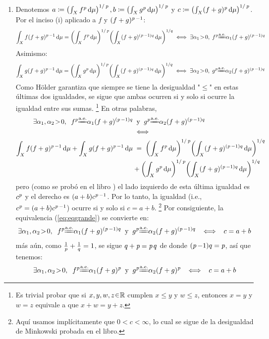 \begin{sol}
\begin{enumerate}[label = (\roman*), leftmargin=1.5em]
\item 
Denotemos $a \coloneq \left(\int_Xf^{\operatorname{\textit{p}}}\dd{\mu}\right)^{1/\operatorname{\textit{p}}}, b \coloneq \left(\int_Xg^{\operatorname{\textit{p}}}\dd{\mu}\right)^{1/\operatorname{\textit{p}}}$ y $c\coloneq \left(\int_X(f+g)^{\operatorname{\textit{p}}}\dd{\mu}\right)^{1/\operatorname{\textit{p}}}$. Por el inciso (i) aplicado a $f$ y $(f+g)^{\operatorname{\textit{p}}-1}$:
\begin{align*}
\int_Xf(f+g)^{\p-1}\dd{\mu} 
=
\left( \int_X f^{\p} \dd{\mu} \right)^{1/\p}\!\left( \int_X (f+g)^{(\p-1)q} \dd{\mu} \right)^{1/q} 
\iff
\exists \alpha_1\!>\!0,\;f^{\p} \!\!\ctpeq\!\! \alpha_1(f+g)^{(\p-1)q}
\end{align*}
Asimismo:
\begin{align*}
\int_Xg(f+g)^{\p-1}\dd{\mu} 
=
\left( \int_X g^{\p} \dd{\mu} \right)^{1/\p}\!\left( \int_X (f+g)^{(\p-1)q} \dd{\mu} \right)^{1/q} 
\iff
\exists \alpha_2\!>\!0,\;g^{\p} \!\!\ctpeq\!\! \alpha_2(f+g)^{(\p-1)q}
\end{align*}
Como Hölder garantiza que siempre se tiene la desigualdad "$\leq$" en estas últimas dos igualdades, se sigue que ambas ocurren si y solo si ocurre la igualdad entre sus sumas.%
\footnote{
    Es trivial probar que si $x,y,w,z\en\mathbb{R}$ cumplen $x \le y$ y $w \le z$, entonces $x=y$ y $w = z$ equivale a que $x+w = y+z$.
}
En otras palabras,
\begin{equation}\label{eq:eqgrande}
\begin{split}
\exists \alpha_1,\alpha_2\!>\!0,\;\; f^{\p} \!\!\ctpeq\!\! \alpha_1(f+g)^{(\p-1)q} &\;\;\text{y}\;\; g^{\p} \!\!\ctpeq\!\! \alpha_2(f+g)^{(\p-1)q}\\
&\iff\\
\int_Xf(f+g)^{\p-1}\dd{\mu} + \int_Xg(f+g)^{\p-1}\dd{\mu} 
&\;=\;
\left( \int_X f^{\p} \dd{\mu} \right)^{1/\p}\!\left( \int_X (f+g)^{(\p-1)q} \dd{\mu} \right)^{1/q}\\
&+ \left( \int_X g^{\p} \dd{\mu} \right)^{1/\p}\!\left( \int_X (f+g)^{(\p-1)q} \dd{\mu} \right)^{1/q}
\end{split}
\end{equation}
pero (como se probó en el libro \cite[p. 135]{Salamon}) el lado izquierdo de esta última igualdad es $c^{\operatorname{\textit{p}}}$ y el derecho es $(a+b)c^{\operatorname{\textit{p}}-1}$. Por lo tanto, la igualdad (i.e., $c^{\operatorname{\textit{p}}} = (a+b)c^{\operatorname{\textit{p}}-1}$) ocurre si y solo si $c = a+b$.%
\footnote{
    Aquí usamos implícitamente que $0<c < \infty$, lo cual se sigue de la desigualdad de Minkowski probada en el libro.
}
Por consiguiente, la equivalencia (\ref{eq:eqgrande}) se convierte en:
\begin{equation*}
\exists \alpha_1,\alpha_2\!>\!0,\;\; f^{\p} \!\!\ctpeq\!\! \alpha_1(f+g)^{(\p-1)q} \;\;\text{y}\;\; g^{\p} \!\!\ctpeq\!\! \alpha_2(f+g)^{(\p-1)q}
\;\;\iff\;\;
c = a+b
\end{equation*}
más aún, como $\frac{1}{\operatorname{\textit{p}}} + \frac{1}{q} = 1$, se sigue $q+\operatorname{\textit{p}} = \operatorname{\textit{p}} q$ de donde $(\operatorname{\textit{p}}-1)q = \operatorname{\textit{p}}$, así que tenemos:
\begin{equation}\label{eq:EquiMink}
\exists \alpha_1,\alpha_2\!>\!0,\;\; f^{\p} \!\!\ctpeq\!\! \alpha_1(f+g)^{\p} \;\;\text{y}\;\; g^{\p} \!\!\ctpeq\!\! \alpha_2(f+g)^{\p}
\;\;\iff\;\;
c = a+b
\end{equation}


\end{enumerate}
\end{sol}
